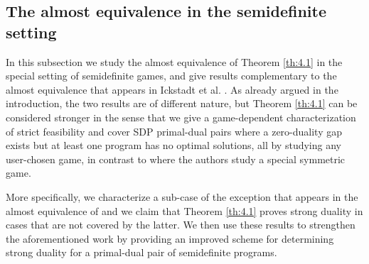 \documentclass[11pt, twoside]{article}
\numberwithin{equation}{section}
\theoremstyle{definition}
\begin{document}
\vspace{-0.1cm}\subsection{The almost equivalence in the semidefinite setting}\vspace{-0.2cm}\label{sec:SDPgames}

In this subsection we study the almost equivalence of Theorem \ref{th:4.1} in the special setting of semidefinite games, and give results complementary to the almost equivalence that appears in Ickstadt et al. \cite{ickstadt2024semidefinite}. As already argued in the introduction, the two results are of different nature, but Theorem \ref{th:4.1} can be considered stronger in the sense that we give a game-dependent characterization of strict feasibility and cover SDP primal-dual pairs where a zero-duality gap exists but at least one program has no optimal solutions, all by studying any user-chosen game, in contrast to \cite{dantzig1951proof, ickstadt2024semidefinite} where the authors study a special symmetric game. \par

More specifically, we characterize a sub-case of the exception that appears in the almost equivalence of \cite{ickstadt2024semidefinite} and we claim that Theorem \ref{th:4.1} proves strong duality in cases that are not covered by the latter. We then use these results to strengthen the aforementioned work by providing an improved scheme for determining strong duality for a primal-dual pair of semidefinite programs.\par
\end{document}
